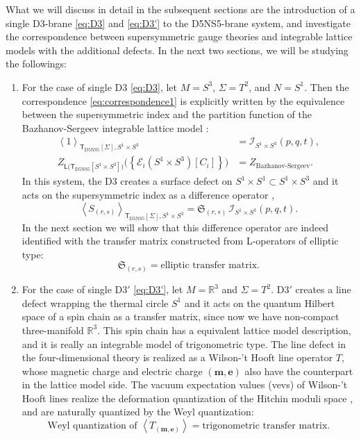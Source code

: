 What we will discuss in detail in the subsequent sections
are the introduction of a single D3-brane \eqref{eq:D3} and \eqref{eq:D3'} to the
D5NS5-brane system, and investigate the correspondence between supersymmetric gauge theories
and integrable lattice models with the additional
defects. In the next two sections, we will be studying the followings:
\begin{enumerate}
	\item For the case of single D3 \eqref{eq:D3}, let $M=S^{3}$, $\Sigma=T^{2}$, and $N=S^{1}$.
Then the correspondence \eqref{eq:correspondence1} is explicitly written by the equivalence between
the supersymmetric index and the partition function of the Bazhanov-Sergeev integrable lattice model
\cite{Bazhanov:2010kz,Bazhanov:2011mz,Yamazaki:2012cp}:
\begin{align}
  \left\langle  1  \right\rangle_{\mathsf{T}_{\mathrm{D5NS5}}[\Sigma],S^{1}\times S^{3}}
    &  =  \mathcal{I}_{S^{1}\times S^{3}}(p,q,t),\\
  Z_{\mathsf{L}\big(\mathsf{T}_{\mathrm{D5NS5}}[S^{1}\times S^{3}]\big)}
    \big( \left\{ \mathcal{E}_{i}(S^{1}\times S^{3})[C_i]\right\} \big)
    &  =  Z_{\text{Bazhanov-Sergeev}}.
\end{align}
In this system, the D3 creates a surface defect on $S^{1}\times S^{1} \subset S^1\times S^3$ and it
acts on the supersymmetric index as a difference operator \cite{Gaiotto:2012xa,Gadde:2013dda},
\begin{equation}
  \left\langle S_{(r,s)}\right\rangle_{\mathsf{T}_{\mathrm{D5NS5}}[\Sigma], S^1\times S^3}
    =
      \mathfrak{S}_{(r,s)} \, \mathcal{I}_{S^{1}\times S^{3}}(p,q,t).
\end{equation}
In the next section we will show that this difference operator are indeed identified with
the transfer matrix constructed from L-operators of elliptic type:
\begin{equation}
  \mathfrak{S}_{(r,s)}
  = \textrm{elliptic transfer matrix.}
\end{equation}
\item For the case of single D3$'$ \eqref{eq:D3'}, let $M=\mathbb{R}^{3}$ and $\Sigma=T^{2}$.
D3$'$ creates a line defect wrapping the thermal circle $S^{1}$ and it acts on the quantum
Hilbert space of a spin chain as a transfer matrix, since now we have
non-compact three-manifold $\mathbb{R}^{3}$.
This spin chain has a equivalent lattice model description, and it is really an integrable model of
trigonometric type. The line defect in the
four-dimensional theory is realized as a Wilson-'t Hooft line operator
$T$, whose magnetic charge and electric charge $(\mathbf{m},\mathbf{e})$
also have the counterpart in the lattice model side.
The vacuum expectation values (vevs) of Wilson-'t Hooft
lines realize the deformation quantization of the Hitchin moduli space \cite{Ito:2011ea},
and are naturally quantized by the Weyl quantization:
\begin{equation}
  \textrm{Weyl quantization of }  \left\langle  T_{\left(\mathbf{m},\mathbf{e}\right)}  \right\rangle
  =  \textrm{trigonometric transfer matrix.}
\end{equation}
\end{enumerate}
